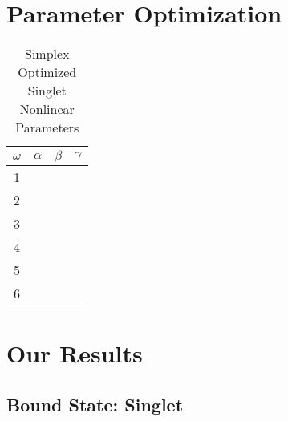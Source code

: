 \documentclass[Dissertation.tex]{subfiles}
\begin{document}
\section{Parameter Optimization}
\label{sec:BoundOptimization}


\setlength{\abovecaptionskip}{6pt}   %
\setlength{\belowcaptionskip}{6pt}   %
\begin{table}[ht]
\caption{Simplex Optimized Singlet Nonlinear Parameters} %
\centering
\begin{tabular}{c c c c}
\hline\hline
$\omega$ & $\alpha$ & $\beta$ & $\gamma$ \\ [0.5ex]
\hline
1 &  &  &  \\
2 &  &  &  \\
3 &  &  &  \\
4 &  &  &  \\
5 &  &  &  \\
6 &  &  &  \\
\hline\hline
\end{tabular}
\label{table:NonlinearOptimized1SSimplex}
\end{table}


\section{Our Results}
\label{sec:BoundResults}

\subsection{Bound State: Singlet}
\end{document}
